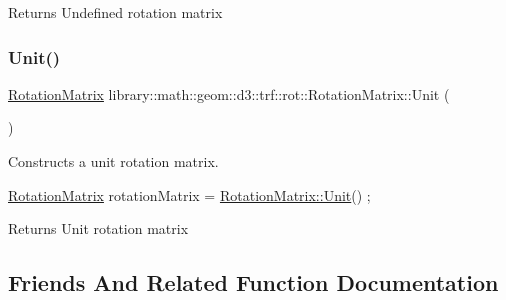 \begin{DoxyReturn}{Returns}
Undefined rotation matrix 
\end{DoxyReturn}
\mbox{\label{classlibrary_1_1math_1_1geom_1_1d3_1_1trf_1_1rot_1_1_rotation_matrix_aeb5324151ee55348fa16c5fe78b036ed}} 
\subsubsection{\texorpdfstring{Unit()}{Unit()}}
{\footnotesize\ttfamily \hyperlink{classlibrary_1_1math_1_1geom_1_1d3_1_1trf_1_1rot_1_1_rotation_matrix}{Rotation\+Matrix} library\+::math\+::geom\+::d3\+::trf\+::rot\+::\+Rotation\+Matrix\+::\+Unit (\begin{DoxyParamCaption}{ }\end{DoxyParamCaption})\hspace{0.3cm}{\ttfamily [static]}}



Constructs a unit rotation matrix. 


\begin{DoxyCode}
\hyperlink{classlibrary_1_1math_1_1geom_1_1d3_1_1trf_1_1rot_1_1_rotation_matrix_a7f1184694020cb4f963d58931324ab06}{RotationMatrix} rotationMatrix = \hyperlink{classlibrary_1_1math_1_1geom_1_1d3_1_1trf_1_1rot_1_1_rotation_matrix_aeb5324151ee55348fa16c5fe78b036ed}{RotationMatrix::Unit}() ;
\end{DoxyCode}


\begin{DoxyReturn}{Returns}
Unit rotation matrix 
\end{DoxyReturn}


\subsection{Friends And Related Function Documentation}
\mbox{\label{classlibrary_1_1math_1_1geom_1_1d3_1_1trf_1_1rot_1_1_rotation_matrix_aa9ed0897a6219331deeb7750017a0df9}} 
